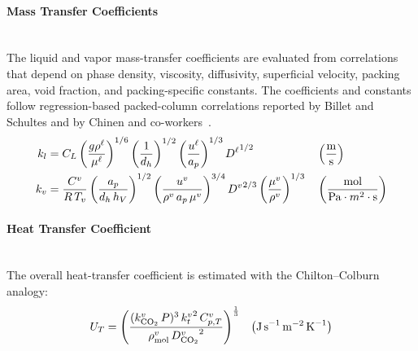                \paragraph{Mass Transfer Coefficients}\mbox{}\\[0.5em]
                The liquid and vapor mass-transfer coefficients are evaluated from correlations that depend on phase density, viscosity, diffusivity, superficial velocity, packing area, void fraction, and packing-specific constants. The coefficients and constants follow regression-based packed-column correlations reported by Billet and Schultes and by Chinen and co-workers~\cite{Billet1999,Chinen2018}.
                \begin{align}
                    k_l &= C_L
                           \left(\frac{g\rho^{\liq}}{\mu^{\liq}}\right)^{1/6}
                           \left(\frac{1}{d_h}\right)^{1/2}
                           \left(\frac{u^{\liq}}{a_p}\right)^{1/3}
                           {D^{\liq}}^{1/2}
                           && \left(\frac{\unit{m} }{\unit{s}} \right)\\
                    k_v &= \frac{C^{\vap}}{R\,T_v}
                           \left(\frac{a_p}{d_h\,h_V}\right)^{1/2}
                           \left(\frac{u^{\vap}}{\rho^{\vap}\,a_p\,\mu^{\vap}}\right)^{3 / 4}
                           {D^{\vap}}^{2 / 3}
                           \left(\frac{\mu^{\vap}}{\rho^{\vap}}\right)^{1 / 3}
                           && \left(\frac{\unit{mol} }{\unit{Pa} \cdot{m}^2 \cdot \unit{s}} \right)
                \end{align}

                \paragraph{Heat Transfer Coefficient}\mbox{}\\[0.5em]
                The overall heat-transfer coefficient is estimated with the Chilton--Colburn analogy:
                \begin{align}
                    U_T = \left(\frac{(k^{\vap}_{\COtwo}\,P)^3\,{k_{t}^{\vap}}^{2}\,C^{\vap}_{p,T}}{\rho^{\vap}_{\text{mol}}\,{D^{\vap}_{\COtwo}}^2}\right)^{\frac{1}{3}}
                    && \left(\unit{J\,s^{-1}\,m^{-2}\,K^{-1}}\right)
                \end{align}

